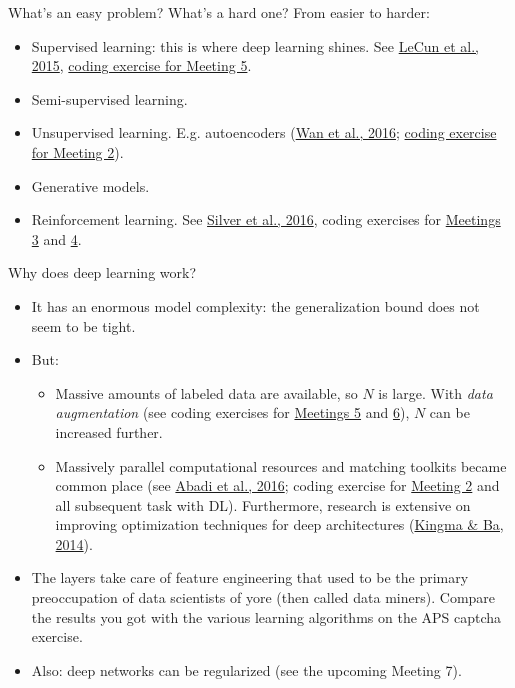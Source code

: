 \documentclass[compress]{beamer}\usetheme{Warsaw}\usecolortheme{crane}\useoutertheme[subsection=false]{smoothbars}
\begin{document}
\begin{frame}{What's an easy problem? What's a hard one?}
	From easier to harder:
	\begin{itemize}
		\item Supervised learning: this is where deep learning shines. See \href{http://doi.org/10.1038/nature14539}{LeCun et al., 2015}, \href{https://github.com/peterwittek/qml-rg\#meeting-5}{coding exercise for Meeting 5}.
		\item Semi-supervised learning.
		\item Unsupervised learning. E.g. autoencoders (\href{https://arxiv.org/abs/1612.01045}{Wan et al., 2016}; \href{https://github.com/peterwittek/qml-rg\#meeting-2}{coding exercise for Meeting 2}).
		\item Generative models.
		\item Reinforcement learning. See \href{http://doi.org/10.1038/nature16961}{Silver et al., 2016}, coding exercises for \href{https://github.com/peterwittek/qml-rg\#meeting-3}{Meetings 3} and \href{https://github.com/peterwittek/qml-rg\#meeting-4}{4}.
	\end{itemize}
\end{frame}

\begin{frame}{Why does deep learning work?}
\begin{itemize}	
	\item It has an enormous model complexity: the generalization bound does not seem to be tight.
	\item But:
	\begin{itemize}
		\item Massive amounts of labeled data are available, so $N$ is large. With \emph{data augmentation} (see coding exercises for \href{https://github.com/peterwittek/qml-rg\#meeting-5}{Meetings 5} and \href{https://github.com/peterwittek/qml-rg\#meeting-6}{6}), $N$ can be increased further.
		\item Massively parallel computational resources and matching toolkits became common place (see \href{https://arxiv.org/abs/1603.04467}{Abadi et al., 2016}; coding exercise for \href{https://github.com/peterwittek/qml-rg\#meeting-2}{Meeting 2} and all subsequent task with DL). Furthermore, research is extensive on improving optimization techniques for deep architectures (\href{https://arxiv.org/abs/1412.6980}{Kingma \& Ba, 2014}).
	\end{itemize}
	\item The layers take care of feature engineering that used to be the primary preoccupation of data scientists of yore (then called data miners). Compare the results you got with the various learning algorithms on the APS captcha exercise.
	\item Also: deep networks can be regularized (see the upcoming Meeting 7).
\end{itemize}
\end{frame}
\end{document}
